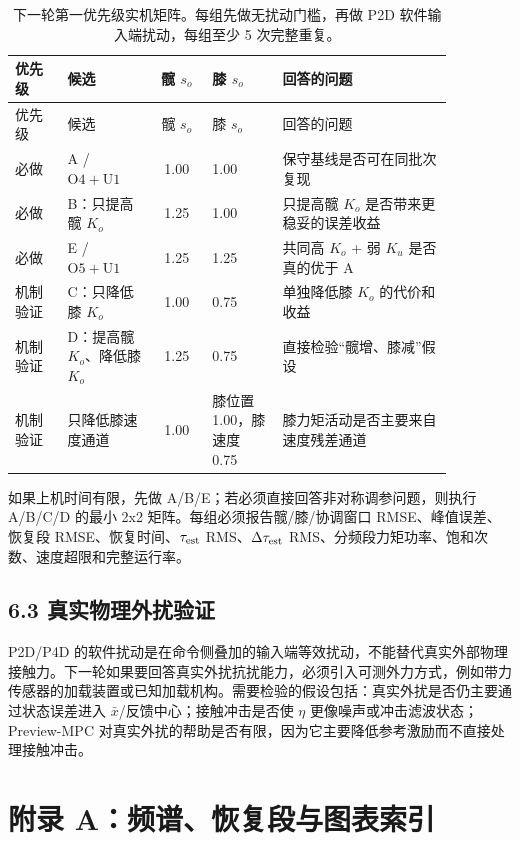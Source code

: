\begin{longtable}[]{@{}L{0.12\linewidth}L{0.20\linewidth}cL{0.16\linewidth}L{0.39\linewidth}@{}}
\caption{下一轮第一优先级实机矩阵。每组先做无扰动门槛，再做 P2D 软件输入端扰动，每组至少 5 次完整重复。}\\
\toprule
优先级 & 候选 & 髋 \(s_o\) & 膝 \(s_o\) & 回答的问题 \\
\midrule
\endfirsthead
\toprule
优先级 & 候选 & 髋 \(s_o\) & 膝 \(s_o\) & 回答的问题 \\
\midrule
\endhead
\bottomrule
\endlastfoot
必做 & A / \(\mathrm{O4+U1}\) & 1.00 & 1.00 & 保守基线是否可在同批次复现 \\
必做 & B：只提高髋 \(K_o\) & 1.25 & 1.00 & 只提高髋 \(K_o\) 是否带来更稳妥的误差收益 \\
必做 & E / \(\mathrm{O5+U1}\) & 1.25 & 1.25 & 共同高 \(K_o\) + 弱 \(K_u\) 是否真的优于 A \\
机制验证 & C：只降低膝 \(K_o\) & 1.00 & 0.75 & 单独降低膝 \(K_o\) 的代价和收益 \\
机制验证 & D：提高髋 \(K_o\)、降低膝 \(K_o\) & 1.25 & 0.75 & 直接检验``髋增、膝减''假设 \\
机制验证 & 只降低膝速度通道 & 1.00 & 膝位置 1.00，膝速度 0.75 & 膝力矩活动是否主要来自速度残差通道 \\
\end{longtable}

如果上机时间有限，先做 A/B/E；若必须直接回答非对称调参问题，则执行 A/B/C/D 的最小 2x2 矩阵。每组必须报告髋/膝/协调窗口 RMSE、峰值误差、恢复段 RMSE、恢复时间、\(\tau_{\rm est}\) RMS、\(\Delta\tau_{\rm est}\) RMS、分频段力矩功率、饱和次数、速度超限和完整运行率。

\subsection{6.3 真实物理外扰验证}

P2D/P4D 的软件扰动是在命令侧叠加的输入端等效扰动，不能替代真实外部物理接触力。下一轮如果要回答真实外扰抗扰能力，必须引入可测外力方式，例如带力传感器的加载装置或已知加载机构。需要检验的假设包括：真实外扰是否仍主要通过状态误差进入 \(\bar{x}\)/反馈中心；接触冲击是否使 \(\eta\) 更像噪声或冲击滤波状态；Preview-MPC 对真实外扰的帮助是否有限，因为它主要降低参考激励而不直接处理接触冲击。

\clearpage
\section{附录 A：频谱、恢复段与图表索引}
\label{sec:appendix-figures}

